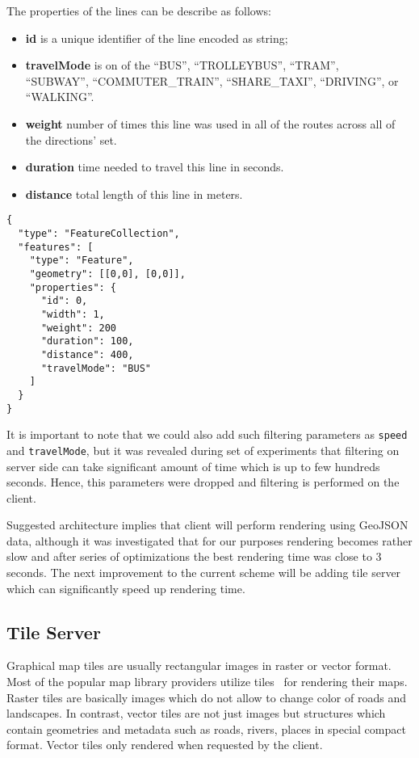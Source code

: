 \begin{itemize}
  The properties of the lines can be describe as follows:
  \begin{itemize}
    \item \textbf{id} is a unique identifier of the line encoded as string;
    \item \textbf{travelMode} is on of the \mbox{``BUS''}, \mbox{``TROLLEYBUS''},
    \mbox{``TRAM''}, \\ \mbox{``SUBWAY''}, \mbox{``COMMUTER\_TRAIN''}, \mbox{``SHARE\_TAXI''},
    \mbox{``DRIVING''}, or \\ \mbox{``WALKING''}.
    \item \textbf{weight} number of times this line was used in all of the routes across all of
    the directions' set.
    \item \textbf{duration} time needed to travel this line in seconds.
    \item \textbf{distance} total length of this line in meters.
  \end{itemize}

  \begin{verbatim}
{
  "type": "FeatureCollection",
  "features": [
    "type": "Feature",
    "geometry": [[0,0], [0,0]],
    "properties": {
      "id": 0,
      "width": 1,
      "weight": 200
      "duration": 100,
      "distance": 400,
      "travelMode": "BUS"
    ]
  }
}
  \end{verbatim}
\end{itemize}

It is important to note that we could also add such filtering parameters as \texttt{speed} and
\texttt{travelMode}, but it was revealed during set of experiments that
filtering on server side can take significant amount of time which is up to few
hundreds seconds. Hence, this parameters were dropped and filtering is performed on the client.

Suggested architecture implies that client will perform rendering using GeoJSON data, although
it was investigated that for our purposes rendering becomes rather slow and after series of
optimizations the best rendering time was close to 3 seconds. The next improvement to the
current scheme will be adding tile server which can significantly speed up rendering time.

\subsection{ Tile Server }
Graphical map tiles are usually rectangular images in raster or vector format. Most of the popular
map library providers utilize tiles~\cite{google:tiles, mapbox:tiles} for rendering their maps.
Raster tiles are basically images which do not allow to change color of roads and landscapes.
In contrast, vector tiles are not just images but structures which contain geometries and
metadata such as roads, rivers, places in special compact format. Vector tiles only rendered when
requested by the client.

